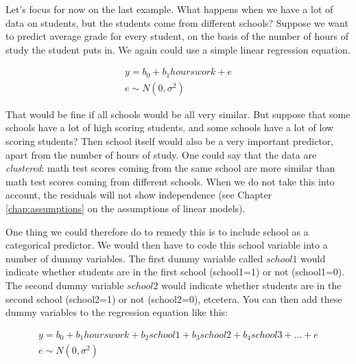 \documentclass[]{book}\usepackage[]{graphicx}\usepackage[]{color}
\begin{document}
Let's focus for now on the last example. What happens when we have a lot of data on students, but the students come from different schools? Suppose we want to predict average grade for every student, on the basis of the number of hours of study the student puts in. We again could use a simple linear regression equation. 

\begin{eqnarray}
y = b_0 + b_1 hourswork + e \\
e \sim N(0, \sigma^2)
\end{eqnarray}



That would be fine if all schools would be all very similar. But suppose that some schools have a lot of high scoring students, and some schools have a lot of low scoring students? Then school itself would also be a very important predictor, apart from the number of hours of study. One could say that the data are \textit{clustered}: math test scores coming from the same school are more similar than math test scores coming from different schools. When we do not take this into account, the residuals will not show independence (see Chapter \ref{chap:assumptions} on the assumptions of linear models).

One thing we could therefore do to remedy this is to include school as a categorical predictor. We would then have to code this school variable into a number of dummy variables. The first dummy variable called $school1$ would indicate whether students are in the first school (school1=1) or not (school1=0). The second dummy variable $school2$ would indicate whether students are in the second school (school2=1) or not (school2=0), etcetera. You can then add these dummy variables to the regression equation like this:

\begin{eqnarray}
y = b_0 + b_1 hourswork + b_2 school1 + b_3 school2 + b_4 school3 + ... + e  \nonumber\\
e \sim N(0, \sigma^2)  \nonumber
\end{eqnarray}
\end{document}
